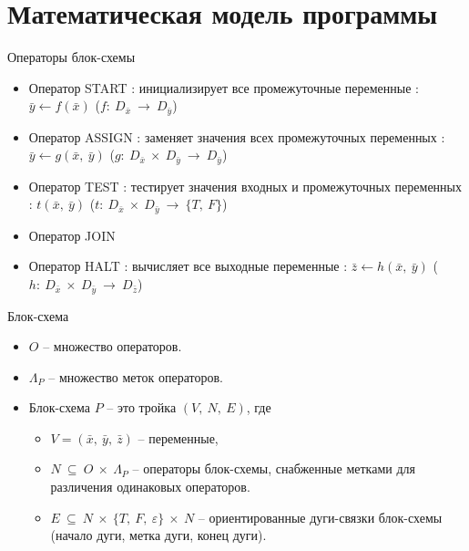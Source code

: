 \documentclass{beamer}
\begin{document}
	\section{Математическая модель программы}

	\begin{frame}{Операторы блок-схемы}
	\begin{itemize}
	\item Оператор START : инициализирует все промежуточные переменные : $\bar{y} \leftarrow f(\bar{x})$ ($f:~D_{\bar{x}}~\rightarrow~D_{\bar{y}}$)
	\item Оператор ASSIGN : заменяет значения всех промежуточных переменных : $\bar{y} \leftarrow g(\bar{x},~\bar{y})$ ($g:~D_{\bar{x}}~\times~D_{\bar{y}}~\rightarrow~D_{\bar{y}}$)
	\item Оператор TEST : тестирует значения входных и промежуточных переменных : $t(\bar{x},~\bar{y})$ ($t:~D_{\bar{x}}~\times~D_{\bar{y}}~\rightarrow~\{T,~F\}$)
	\item Оператор JOIN
	\item Оператор HALT : вычисляет все выходные переменные : $\bar{z} \leftarrow h(\bar{x},~\bar{y})$ ($h:~D_{\bar{x}}~\times~D_{\bar{y}}~\rightarrow~D_{\bar{z}}$)
	\end{itemize}
	\end{frame}

	\begin{frame}{Блок-схема}
	\begin{itemize}
	\item $O$ -- множество операторов.
	\item $\Lambda_{P}$ -- множество меток операторов.
	\item Блок-схема $P$ -- это тройка $(V,~N,~E)$, где
		\begin{itemize}
		\item $V = (\bar{x},~\bar{y},~\bar{z})$ -- переменные,
		\item $N~\subseteq~O~\times~\Lambda_{P}$ -- операторы блок-схемы, снабженные метками для различения одинаковых операторов.
		\item $E~\subseteq~N~\times~\{T,~F,~\varepsilon\}~\times~N$ -- ориентированные дуги-связки блок-схемы (начало дуги, метка дуги, конец дуги).
		\end{itemize}
	\end{itemize}
	\end{frame}
\end{document}
